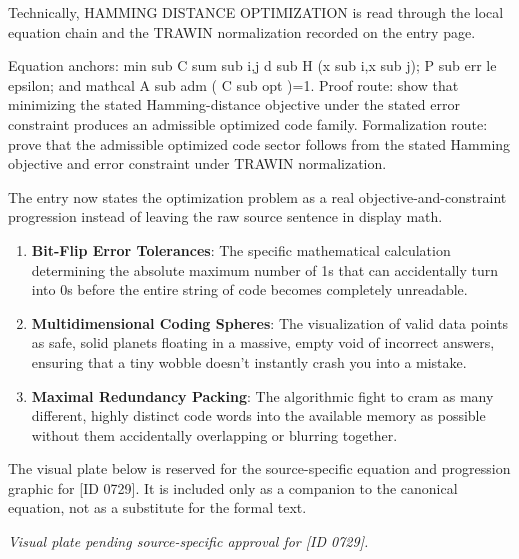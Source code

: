 Technically, HAMMING DISTANCE OPTIMIZATION is read through the local equation chain and the TRAWIN normalization recorded on the entry page.

Equation anchors: min sub C sum sub i,j d sub H (x sub i,x sub j); P sub err le epsilon; and mathcal A sub adm ( C sub opt )=1. Proof route: show that minimizing the stated Hamming-distance objective under the stated error constraint produces an admissible optimized code family. Formalization route: prove that the admissible optimized code sector follows from the stated Hamming objective and error constraint under TRAWIN normalization.

The entry now states the optimization problem as a real objective-and-constraint progression instead of leaving the raw source sentence in display math.
\endgroup

\begin{enumerate}[leftmargin=1.6em,itemsep=6pt,topsep=4pt]
\item \textbf{Bit-Flip Error Tolerances}: The specific mathematical calculation determining the absolute maximum number of 1s that can accidentally turn into 0s before the entire string of code becomes completely unreadable.
\item \textbf{Multidimensional Coding Spheres}: The visualization of valid data points as safe, solid planets floating in a massive, empty void of incorrect answers, ensuring that a tiny wobble doesn't instantly crash you into a mistake.
\item \textbf{Maximal Redundancy Packing}: The algorithmic fight to cram as many different, highly distinct code words into the available memory as possible without them accidentally overlapping or blurring together.
\end{enumerate}

\begingroup\footnotesize\sloppy
The visual plate below is reserved for the source-specific equation and progression graphic for [ID 0729]. It is included only as a companion to the canonical equation, not as a substitute for the formal text.
\par\endgroup
\begingroup\footnotesize\itshape
Visual plate pending source-specific approval for [ID 0729].
\par\endgroup

